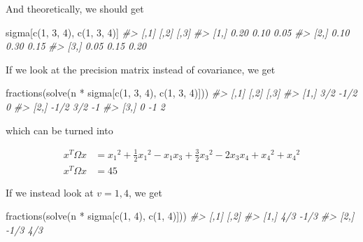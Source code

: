 \documentclass[
]{article}
\newenvironment{Shaded}{\begin{snugshade}}{\end{snugshade}}
\newcommand{\CommentTok}[1]{\textcolor[rgb]{0.56,0.35,0.01}{\textit{#1}}}
\newcommand{\DecValTok}[1]{\textcolor[rgb]{0.00,0.00,0.81}{#1}}
\newcommand{\FunctionTok}[1]{\textcolor[rgb]{0.00,0.00,0.00}{#1}}
\newcommand{\NormalTok}[1]{#1}
\newcommand{\SpecialCharTok}[1]{\textcolor[rgb]{0.00,0.00,0.00}{#1}}
\begin{document}
And theoretically, we should get

\begin{Shaded}
\begin{Highlighting}[]
\NormalTok{sigma[}\FunctionTok{c}\NormalTok{(}\DecValTok{1}\NormalTok{, }\DecValTok{3}\NormalTok{, }\DecValTok{4}\NormalTok{), }\FunctionTok{c}\NormalTok{(}\DecValTok{1}\NormalTok{, }\DecValTok{3}\NormalTok{, }\DecValTok{4}\NormalTok{)]}
\CommentTok{\#\textgreater{}      [,1] [,2] [,3]}
\CommentTok{\#\textgreater{} [1,] 0.20 0.10 0.05}
\CommentTok{\#\textgreater{} [2,] 0.10 0.30 0.15}
\CommentTok{\#\textgreater{} [3,] 0.05 0.15 0.20}
\end{Highlighting}
\end{Shaded}

If we look at the precision matrix instead of covariance, we get

\begin{Shaded}
\begin{Highlighting}[]
\FunctionTok{fractions}\NormalTok{(}\FunctionTok{solve}\NormalTok{(n }\SpecialCharTok{*}\NormalTok{ sigma[}\FunctionTok{c}\NormalTok{(}\DecValTok{1}\NormalTok{, }\DecValTok{3}\NormalTok{, }\DecValTok{4}\NormalTok{), }\FunctionTok{c}\NormalTok{(}\DecValTok{1}\NormalTok{, }\DecValTok{3}\NormalTok{, }\DecValTok{4}\NormalTok{)]))}
\CommentTok{\#\textgreater{}      [,1] [,2] [,3]}
\CommentTok{\#\textgreater{} [1,]  3/2 {-}1/2    0}
\CommentTok{\#\textgreater{} [2,] {-}1/2  3/2   {-}1}
\CommentTok{\#\textgreater{} [3,]    0   {-}1    2}
\end{Highlighting}
\end{Shaded}

which can be turned into

\begin{align}
x^T \Omega x &= {x_1}^2 + \frac{1}{2} {x_1}^2 - x_1 x_3 + \frac{3}{2} {x_3}^2 - 2 x_3 x_4 + {x_4}^2 + {x_4}^2 \\
x^T \Omega x &= 45
\end{align}

If we instead look at \(v = 1, 4\), we get

\begin{Shaded}
\begin{Highlighting}[]
\FunctionTok{fractions}\NormalTok{(}\FunctionTok{solve}\NormalTok{(n }\SpecialCharTok{*}\NormalTok{ sigma[}\FunctionTok{c}\NormalTok{(}\DecValTok{1}\NormalTok{, }\DecValTok{4}\NormalTok{), }\FunctionTok{c}\NormalTok{(}\DecValTok{1}\NormalTok{, }\DecValTok{4}\NormalTok{)]))}
\CommentTok{\#\textgreater{}      [,1] [,2]}
\CommentTok{\#\textgreater{} [1,]  4/3 {-}1/3}
\CommentTok{\#\textgreater{} [2,] {-}1/3  4/3}
\end{Highlighting}
\end{Shaded}
\end{document}
